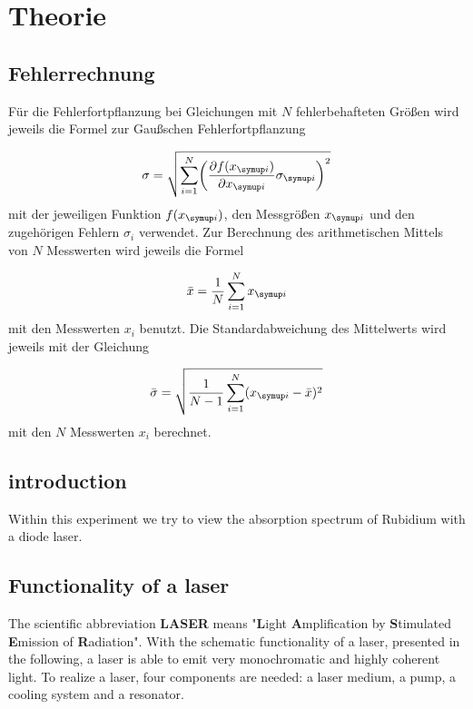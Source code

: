 \section{Theorie}
\label{sec:Theorie}

\subsection{Fehlerrechnung}

Für die Fehlerfortpflanzung bei Gleichungen mit $N$ fehlerbehafteten Größen
wird jeweils die Formel zur Gaußschen Fehlerfortpflanzung

\begin{equation*}
  \sigma = \sqrt{\sum_{i=1}^{N}\biggl(\frac{\partial f(x_{\g{i}})}{\partial x_{\g{i}}}
  \sigma_{\g{i}}\biggr)^2}
\end{equation*}
mit der jeweiligen Funktion $f(x_{\g{i}})$, den Messgrößen $x_{\g{i}}$ und den
zugehörigen Fehlern $\sigma_i$ verwendet.
Zur Berechnung des arithmetischen Mittels von $N$ Messwerten wird jeweils die
Formel

\begin{equation*}
  \bar{x} = \frac{1}{N}\sum_{i=1}^{N}x_{\g{i}}
\end{equation*}
mit den Messwerten $x_i$ benutzt.
Die Standardabweichung des Mittelwerts wird jeweils mit der Gleichung

\begin{equation*}
  \bar{\sigma} = \sqrt{\frac{1}{N-1}\sum_{i=1}^{N}(x_{\g{i}} - \bar{x})^2}
\end{equation*}
mit den $N$ Messwerten $x_i$ berechnet.

\subsection{introduction}

Within this experiment we try to view the absorption spectrum of Rubidium with a diode laser.

\subsection{Functionality of a laser}
\label{sec:laser}

The scientific abbreviation \textbf{LASER} means "\textbf{L}ight \textbf{A}mplification by \textbf{S}timulated \textbf{E}mission of \textbf{R}adiation".
With the schematic functionality of a laser, presented in the following, a laser is able to emit
very monochromatic and highly coherent light. To realize a laser, four components are needed: a laser medium, a pump, a cooling system and a resonator.

